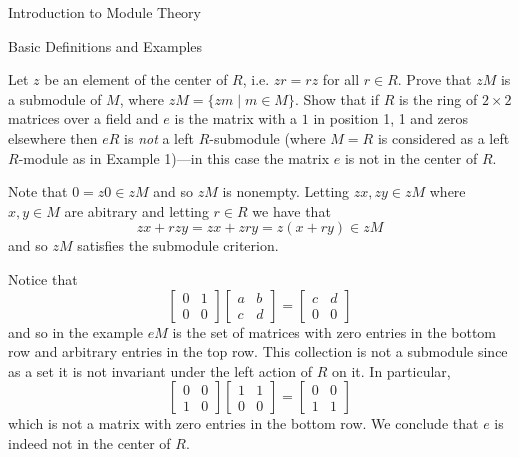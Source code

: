 \begin{chapter}{Introduction to Module Theory}
\begin{section}{Basic Definitions and Examples}
\begin{problem}\label{ex:10.1.14}
Let $z$ be an element of the center of $R$, i.e. $zr=rz$ for all $r\in R$. Prove that $zM$ is a submodule of $M$, where $zM = \{zm\mid m\in M\}$. Show that if $R$ is the ring of $2\times 2$ matrices over a field and $e$ is the matrix with a $1$ in position 1, 1 and zeros elsewhere then $eR$ is \emph{not} a left $R$-submodule (where $M=R$ is considered as a left $R$-module as in Example 1)---in this case the matrix $e$ is not in the center of $R$.
\end{problem}
\begin{solution}Note that $0 = z0 \in zM$ and so $zM$ is nonempty. Letting $zx,zy\in zM$ where $x,y\in M$ are abitrary and letting $r\in R$ we have that \[
zx + rzy = zx+zry = z(x+ry) \in zM
\]
and so $zM$ satisfies the submodule criterion. 

Notice that \[
\begin{bmatrix}
0&1\\
0&0
\end{bmatrix}\begin{bmatrix}
a&b\\
c&d
\end{bmatrix} = \begin{bmatrix}
c&d\\
0&0
\end{bmatrix}
\]
and so in the example $eM$ is the set of matrices with zero entries in the bottom row and arbitrary entries in the top row. This collection is not a submodule since as a set it is not invariant under the left action of $R$ on it. In particular, \[
\begin{bmatrix}
0&0\\
1&0
\end{bmatrix}\begin{bmatrix}
1&1\\
0&0
\end{bmatrix} = \begin{bmatrix}
0&0\\
1&1
\end{bmatrix}
\]
which is not a matrix with zero entries in the bottom row. We conclude that $e$ is indeed not in the center of $R$.

\end{solution}\oneperpage




\end{section}
\end{chapter}
